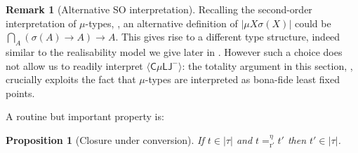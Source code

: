 \documentclass[10pt,a4paper]{amsart}
\theoremstyle{plain}
\newtheorem{proposition}[proposition]{Proposition}
\theoremstyle{definition}
\newtheorem{remark}[remark]{Remark}
\newcommand{\dfn}{:=}
\theoremstyle{plain}
\theoremstyle{definition} %
\newcommand{\closure}[1]{\langle #1 \rangle}
\newcommand{\clocmuLJneg}{\closure{\cmuLJneg}}
\newcommand{\lr}[1]{#1_l}
\newcommand{\rr}[1]{#1_r}
\newcommand{\LJ}{\mathsf{LJ}}
\newcommand{\muLJ}{\mu\LJ}
\newcommand{\circular}{\mathsf C}
\newcommand{\cmuLJ}{\circular\muLJ}
\newcommand{\cmuLJneg}{\cmuLJ^-}
\newcommand{\reductionnorec}{\mathrm{r}'}
\newcommand{\convertsnoreceta}{=_{\reductionnorec}^\eta} %
\newcommand{\extensional}{\eta} %
\newcommand{\hr}[1]{|#1|}
\begin{document}
\begin{remark}
    [Alternative SO interpretation]
    Recalling the second-order interpretation of $\mu$-types, , an alternative definition of $\hr {\mu X \sigma(X)}$ could be $\bigcap_A (\sigma(A)\to A) \to A$.
    This gives rise to a different type structure, indeed similar to the realisability model we give later in .
    However such a choice does not allow us to readily interpret $\clocmuLJneg$: the totality argument in this section, , crucially exploits the fact that $\mu$-types are interpreted as bona-fide least fixed points.
\end{remark}

A routine but important property is:
\begin{proposition}
    [Closure under conversion]
    \label{prop:hr-closed-under-conversion}
    If $t \in \hr \tau$ and $t \convertsnoreceta t'$ then $t'\in \hr\tau$.
\end{proposition}
\end{document}

